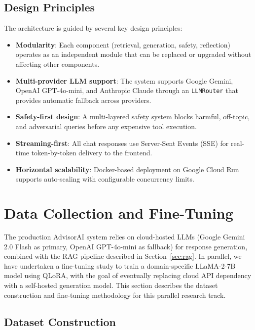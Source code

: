 \documentclass[conference,compsoc]{IEEEtran}
\begin{document}
\subsection{Design Principles}

The architecture is guided by several key design principles:

\begin{itemize}
    \item \textbf{Modularity}: Each component (retrieval, generation, safety, reflection) operates as an independent module that can be replaced or upgraded without affecting other components.
    \item \textbf{Multi-provider LLM support}: The system supports Google Gemini, OpenAI GPT-4o-mini, and Anthropic Claude through an \texttt{LLMRouter} that provides automatic fallback across providers.
    \item \textbf{Safety-first design}: A multi-layered safety system blocks harmful, off-topic, and adversarial queries before any expensive tool execution.
    \item \textbf{Streaming-first}: All chat responses use Server-Sent Events (SSE) for real-time token-by-token delivery to the frontend.
    \item \textbf{Horizontal scalability}: Docker-based deployment on Google Cloud Run supports auto-scaling with configurable concurrency limits.
\end{itemize}

\section{Data Collection and Fine-Tuning}
\label{sec:finetuning}

The production AdvisorAI system relies on cloud-hosted LLMs (Google Gemini 2.0 Flash as primary, OpenAI GPT-4o-mini as fallback) for response generation, combined with the RAG pipeline described in Section~\ref{sec:rag}. In parallel, we have undertaken a fine-tuning study to train a domain-specific LLaMA-2-7B model using QLoRA, with the goal of eventually replacing cloud API dependency with a self-hosted generation model. This section describes the dataset construction and fine-tuning methodology for this parallel research track.

\subsection{Dataset Construction}
\end{document}
